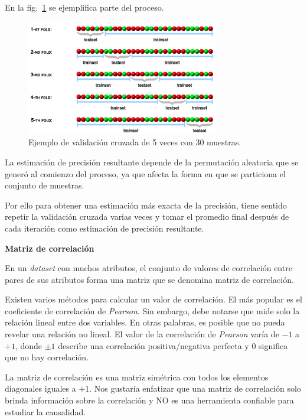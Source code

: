 \documentclass[a4paper,12pt]{article}
\begin{document}
En la fig.~\ref{fig:kfolds} se ejemplifica parte del proceso.

\begin{figure}[H]
	\begin{center}
	\includegraphics[width=0.75\textwidth]{tesis_67.png}
  	\caption{Ejemplo de validación cruzada de 5 veces con 30 muestras.}
  	\label{fig:kfolds}
  	\end{center}
\end{figure}

La estimación de precisión resultante depende de la permutación aleatoria que se generó al comienzo del proceso, ya que afecta la forma en que se particiona el conjunto de muestras. 

Por ello para obtener una estimación más exacta de la precisión, tiene sentido repetir la validación cruzada varias veces y tomar el promedio final después de cada iteración como estimación de precisión resultante.

\begin{python}

\end{python}

\textbf{Matriz de correlación}

En un \textit{dataset} con muchos atributos, el conjunto de valores de correlación entre pares de sus atributos forma una matriz que se denomina matriz de correlación.

Existen varios métodos para calcular un valor de correlación. El más popular es el coeficiente de correlación de \textit{Pearson}. Sin embargo, debe notarse que mide solo la relación lineal entre dos variables. En otras palabras, es posible que no pueda revelar una relación no lineal. El valor de la correlación de \textit{Pearson} varía de $-1$ a $+1$, donde $\pm1$ describe una correlación positiva/negativa perfecta y $0$ significa que no hay correlación. \citep{corrmatrix}

La matriz de correlación es una matriz simétrica con todos los elementos diagonales iguales a $+1$. Nos gustaría enfatizar que una matriz de correlación solo brinda información sobre la correlación y NO es una herramienta confiable para estudiar la causalidad. 
\end{document}
